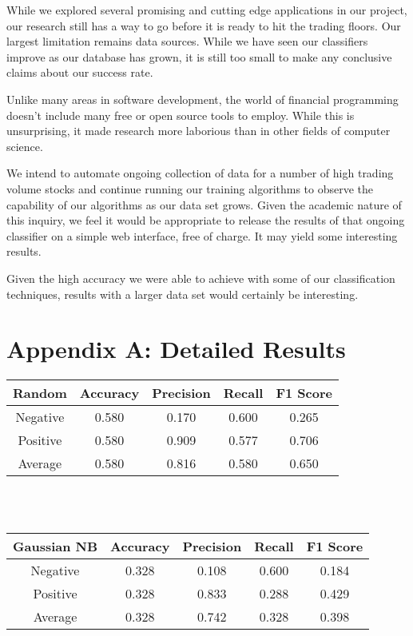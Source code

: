 \documentclass[letterpaper]{article}
\begin{document}
\noindent While we explored several promising and cutting edge applications in our project, our research still has a way to go before it is ready to hit the trading floors. Our largest limitation remains data sources.  While we have seen our classifiers improve as our database has grown, it is still too small to make any conclusive claims about our success rate.

Unlike many areas in software development, the world of financial programming doesn't include many free or open source tools to employ. While this is unsurprising, it made research more laborious than in other fields of computer science.

We intend to automate ongoing collection of data for a number of high trading volume stocks and continue running our training algorithms to observe the capability of our algorithms as our data set grows. Given the academic nature of this inquiry, we feel it would be appropriate to release the results of that ongoing classifier on a simple web interface, free of charge.  It may yield some interesting results.

Given the high accuracy we were able to achieve with some of our classification techniques, results with a larger data set would certainly be interesting. 

\section{Appendix A: Detailed Results}

\begin{tabular}{c | c c c c}
\textbf{Random} & Accuracy  & Precision & Recall    & F1 Score  \\
\hline
Negative        & 0.580     & 0.170     & 0.600     & 0.265     \\
Positive        & 0.580     & 0.909     & 0.577     & 0.706     \\
Average         & 0.580     & 0.816     & 0.580     & 0.650     \\
\end{tabular} \\ \\



\begin{tabular}{c | c c c c}
\textbf{Gaussian NB}    & Accuracy  & Precision & Recall    & F1 Score  \\
\hline
Negative        & 0.328     & 0.108     & 0.600     & 0.184     \\
Positive        & 0.328     & 0.833     & 0.288     & 0.429     \\
Average         & 0.328     & 0.742     & 0.328     & 0.398     \\
\end{tabular} \\ \\
\end{document}
